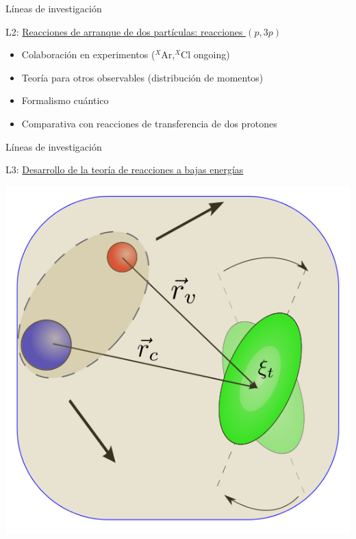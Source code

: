 \documentclass{beamer}
\begin{document}
\begin{frame}{Líneas de investigación} 

\large {} L2: \underline{Reacciones de arranque de dos partículas: reacciones $(p, 3p)$} 

\normalsize
    
\begin{itemize}
\item Colaboración en experimentos ($^X$Ar,$^X$Cl ongoing)
\item Teoría para otros observables (distribución de momentos)
\item Formalismo cuántico
\item Comparativa con reacciones de transferencia de dos protones

\end{itemize}    
    
\end{frame}

\begin{frame}{Líneas de investigación} 

\large {}  L3: \underline{Desarrollo de la teoría de reacciones a bajas energías} 

\normalsize
\begin{center}    
\includegraphics[height=0.3\textheight, width=\textwidth, keepaspectratio]{TExc.png}
\end{center}
    
\end{frame}
\end{document}
